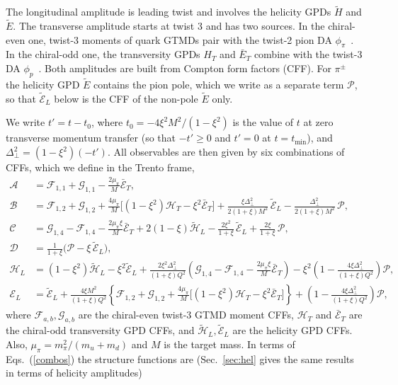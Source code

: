 \documentclass[aps,prd,showpacs,notitlepage,nofootinbib,preprintnumbers,amsmath,amssymb]{revtex4-2}
\def\sec#1{Sec.~\ref{#1}}
\newcommand{\cA}{\mathcal A}
\newcommand{\cB}{\mathcal B}
\newcommand{\cC}{\mathcal C}
\newcommand{\cH}{\mathcal H_L}
\newcommand{\cE}{\mathcal E_L}
\newcommand{\cD}{\mathcal D}
\newcommand{\cP}{\mathcal P}
\newcommand{\Dp}{\Delta_\perp}
\begin{document}
The longitudinal amplitude is leading twist and involves the helicity GPDs $\tilde H$ and $\tilde E$. The transverse amplitude starts at twist 3 and has two sources. In the chiral-even one, twist-3 moments of quark GTMDs pair with the twist-2 pion DA $\phi_\pi$~\cite{Bhattacharya:2023hbq}. In the chiral-odd one, the transversity GPDs $H_T$ and $\bar E_T$ combine with the twist-3 DA $\phi_p$~\cite{Goloskokov:2009ia,Goloskokov:2011rd}. Both amplitudes are built from Compton form factors (CFF). For $\pi^\pm$ the helicity GPD $\tilde E$ contains the pion pole, which we write as a separate term $\cP$, so that $\tilde{\mathcal E}_L$ below is the CFF of the non-pole $\tilde E$ only. 

We write $t'=t-t_0$, where $t_0=-4\xi^2M^2/(1-\xi^2)$ is the value of $t$ at zero transverse momentum transfer (so that $-t'\ge0$ and $t'=0$ at $t=t_{\min}$), and $\Dp^2=(1-\xi^2)(-t')$. All observables are then given by six combinations of CFFs, which we define in the Trento frame,
\begin{subequations}\label{combos}
\begin{align}
\cA&=\mathcal F_{1,1}+\mathcal G_{1,1}-\frac{2\mu_\pi}{M}\bar{\mathcal E}_T,
\\
\cB&=\mathcal F_{1,2}+\mathcal G_{1,2}+\frac{4\mu_\pi}{M}\Big[(1-\xi^2)\mathcal H_T-\xi^2\bar{\mathcal E}_T\Big]+\frac{\xi\Dp^2}{2(1+\xi)M^2}\,\tilde{\mathcal E}_L-\frac{\Dp^2}{2(1+\xi)M^2}\,\cP,
\\
\cC&=\mathcal G_{1,4}-\mathcal F_{1,4}-\frac{2\mu_\pi\xi}{M}\bar{\mathcal E}_T+2(1-\xi)\tilde{\mathcal H}_L-\frac{2\xi^2}{1+\xi}\,\tilde{\mathcal E}_L+\frac{2\xi}{1+\xi}\,\cP,
\\
\cD&=\frac{1}{1+\xi}\Big(\cP-\xi\,\tilde{\mathcal E}_L\Big),
\\
\cH&=(1-\xi^2)\tilde{\mathcal H}_L-\xi^2\tilde{\mathcal E}_L+\frac{2\xi^2\Dp^2}{(1+\xi)Q^2}\left(\mathcal G_{1,4}-\mathcal F_{1,4}-\frac{2\mu_\pi\xi}{M}\bar{\mathcal E}_T\right)-\xi^2\left(1-\frac{4\xi\Dp^2}{(1+\xi)Q^2}\right)\cP,
\\
\cE&=\tilde{\mathcal E}_L+\frac{4\xi M^2}{(1+\xi)Q^2}\left\{\mathcal F_{1,2}+\mathcal G_{1,2}+\frac{4\mu_\pi}{M}\Big[(1-\xi^2)\mathcal H_T-\xi^2\bar{\mathcal E}_T\Big]\right\}+\left(1-\frac{4\xi\Dp^2}{(1+\xi)Q^2}\right)\cP,
\end{align}
\end{subequations}
where $\mathcal{F}_{a,b}, \mathcal{G}_{a,b}$ are the chiral-even twist-3 GTMD moment CFFs, $\mathcal{H}_T$ and $\bar{\mathcal E}_T$ are the chiral-odd transversity GPD CFFs, and $\tilde{\mathcal H}_L, \tilde{\mathcal E}_L$ are the helicity GPD CFFs. Also, $\mu_\pi=m_\pi^2/(m_u+m_d)$ and $M$ is the target mass. In terms of Eqs.~(\ref{combos}) the structure functions are (\sec{sec:hel} gives the same results in terms of helicity amplitudes)
\end{document}
